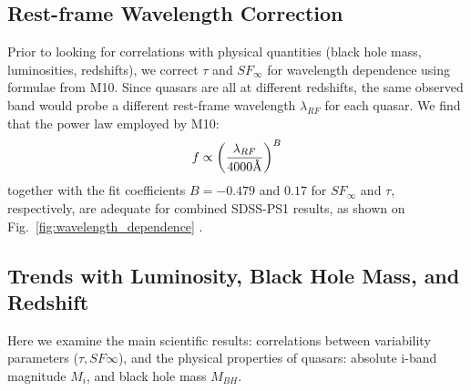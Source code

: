 \documentclass[twocolumn]{aastex62}
\let\oldAA\AA
\renewcommand{\AA}{\text{\normalfont\oldAA}}
\begin{document}
\subsection{Rest-frame Wavelength Correction}

Prior to looking for correlations with physical quantities (black hole mass, luminosities, redshifts), we correct $\tau$ and $SF_{\infty}$ for wavelength dependence using formulae from M10. Since quasars are all at different redshifts, the same observed band would probe a different rest-frame wavelength $\lambda_{RF}$ for each quasar. We find that the power law employed by M10:
\begin{equation}
f \propto \left( \frac{\lambda_{RF}}{4000 \mbox{\AA}} \right)^{B}
\end{equation}
together with the fit coefficients $B=-0.479$ and $0.17$ for $SF_{\infty}$ and $\tau$, respectively, are adequate for combined SDSS-PS1 results, as shown on Fig.~\ref{fig:wavelength_dependence} . 

  
\begin{figure*}
\caption{Rest-frame timescale $\tau$ (top panel), and asymptotic structure function $SF_{\infty}$ (bottom panel), as a function of rest-frame wavelength $\lambda_{RF}$. The background contours show M10 SDSS $ugriz$ data, and the foreground contours  denote our results using  SDSS (red) and SDSS-PS1 (orange) segments. The red line indicates the best-fit power law to M10 data, with $B=0.17$ an $-0.479$ for $\tau_{RF}$, and $SF_{\infty}$, respectively.}
\label{fig:wavelength_dependence}
\end{figure*} 


\subsection{Trends with Luminosity, Black Hole Mass, and Redshift}

Here we examine the main scientific results: correlations between variability parameters  ($\tau, SF{\infty}$), and the physical properties of quasars: absolute i-band magnitude $M_{i}$, and black hole mass $M_{BH}$. 


\begin{figure*}
\caption{Distribution of quasars as a function of  redshift, observed i-band magnitude, absolute i-band magnitude (K-corrected to z=2), and virial black hole mass. All quantities from \citep{shen2011}. }
\label{fig:quasar_properties}
\end{figure*} 
\end{document}
